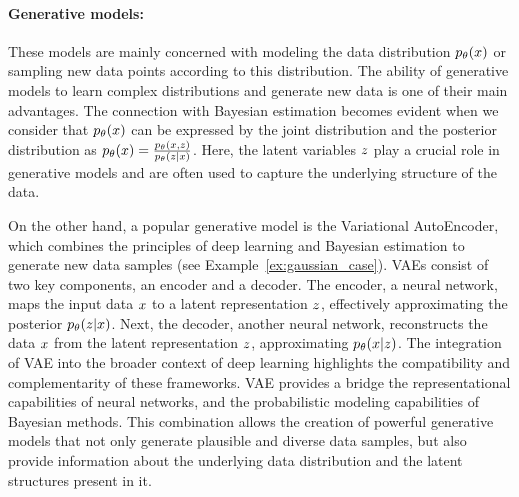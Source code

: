 \paragraph*{Generative models:}
These models are mainly concerned with modeling the data distribution
$p_{\theta}(x)$ or sampling new data points according to this distribution. 
The ability of generative models to learn complex distributions and 
generate new data is one of  their main advantages.
The connection with Bayesian estimation becomes evident when we consider that
$p_{\theta}(x)$ can be expressed by the joint distribution and the posterior
distribution as $p_{\theta}(x) = \frac{p_{\theta}(x, z)}{p_{\theta}(z|x)}$. 
Here, the latent variables $z$ play a crucial role in generative models
and are often used to capture the underlying structure of the data.

On the other hand, a popular generative model is the Variational AutoEncoder,
which combines the principles of deep learning and Bayesian estimation to
generate new data samples (see Example~\ref{ex:gaussian_case}).
VAEs consist of two key components, an encoder and a decoder. 
The encoder, a neural network, maps the input data $x$
to a latent representation $z$, effectively approximating the posterior
$p_{\theta}(z|x)$. Next, the decoder, another neural network, reconstructs the data
$x$ from the latent representation $z$, approximating $p_{\theta}(x|z)$.
The integration of VAE into the broader context of deep learning highlights the
compatibility and complementarity of these frameworks. VAE provides a bridge the
representational capabilities of neural networks, and the probabilistic modeling
capabilities of Bayesian methods. This combination allows the creation of
powerful generative models that not only generate plausible and diverse data
samples, but also provide information about the underlying data distribution and
the latent structures present in it.



